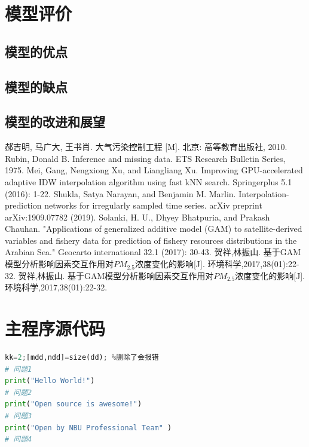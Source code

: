 \documentclass[a4paper,10pt]{my_paper}
\numberwithin{equation}{section}
\begin{document}
\section{模型评价}

\subsection{模型的优点}

\subsection{模型的缺点}

\subsection{模型的改进和展望}

\begin{thebibliography}{10}
郝吉明, 马广大, 王书肖. 大气污染控制工程 [M]. 北京: 高等教育出版社, 2010.
Rubin, Donald B. Inference and missing data. ETS Research Bulletin Series, 1975.
Mei, Gang, Nengxiong Xu, and Liangliang Xu. Improving GPU-accelerated adaptive IDW interpolation algorithm using fast kNN search. Springerplus 5.1 (2016): 1-22.
Shukla, Satya Narayan, and Benjamin M. Marlin. Interpolation-prediction networks for irregularly sampled time series. arXiv preprint arXiv:1909.07782 (2019).
Solanki, H. U., Dhyey Bhatpuria, and Prakash Chauhan. "Applications of generalized additive model (GAM) to satellite-derived variables and fishery data for prediction of fishery resources distributions in the Arabian Sea." Geocarto international 32.1 (2017): 30-43.
贺祥,林振山. 基于GAM模型分析影响因素交互作用对${PM_{2.5}}$浓度变化的影响[J]. 环境科学,2017,38(01):22-32.
贺祥,林振山. 基于GAM模型分析影响因素交互作用对${PM_{2.5}}$浓度变化的影响[J]. 环境科学,2017,38(01):22-32.
\end{thebibliography}

\newpage

\appendix

\section{主程序源代码}

\begin{lstlisting}[language=Python]%设置不同语言即可。
kk=2;[mdd,ndd]=size(dd); %删除了会报错
# 问题1
print("Hello World!")
# 问题2
print("Open source is awesome!")
# 问题3
print("Open by NBU Professional Team" )
# 问题4

\end{lstlisting}
\end{document}
